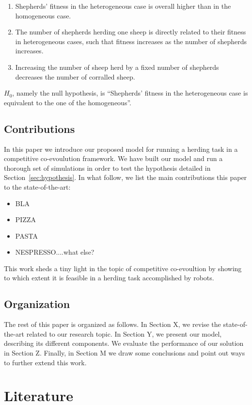 \documentclass[conference]{IEEEtran}
\begin{document}
\begin{enumerate}
	\item Shepherds' fitness in the heterogeneous case is overall higher than in the homogeneous case.
	\item The number of shepherds herding one sheep is directly related to their fitness in heterogeneous cases, such that fitness increases as the number of shepherds increases.	
	\item Increasing the number of sheep herd by a fixed number of shepherds decreases the number of corralled sheep.
\end{enumerate}
$H_0$, namely the null hypothesis, is ``Shepherds’ fitness in the heterogeneous case is equivalent to the one of the homogeneous''.

\subsection{Contributions}
In this paper we introduce our proposed model for running a herding task in a competitive co-evoulution framework. 
We have built our model and run a thorough set of simulations in order to test the hypothesis detailed in Section~\ref{sec:hypothesis}. 
In what follow, we list the main contributions this paper to the state-of-the-art:
\begin{itemize}
	\item BLA
	\item PIZZA
	\item PASTA
	\item NESPRESSO....what else?
\end{itemize}

This work sheds a tiny light in the topic of competitive co-evoultion by showing to which extent it is feasible in a herding task accomplished by robots.

\subsection{Organization}
The rest of this paper is organized as follows. 
In Section X, we revise the state-of-the-art related to our research topic. 
In Section Y, we present our model, describing its different components. 
We evaluate the performance of our solution in Section Z. 
Finally, in Section M we draw some conclusions and point out ways to further extend this work.

\section{Literature}
 
\end{document}

